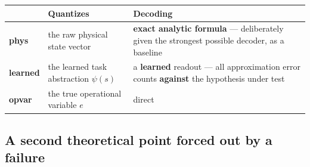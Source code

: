 \documentclass[11pt]{article}
\begin{document}
\begin{longtable}[]{@{}lll@{}}
\toprule
\begin{minipage}[b]{0.30\columnwidth}\raggedright
\strut
\end{minipage} & \begin{minipage}[b]{0.30\columnwidth}\raggedright
Quantizes\strut
\end{minipage} & \begin{minipage}[b]{0.30\columnwidth}\raggedright
Decoding\strut
\end{minipage}\tabularnewline
\midrule
\endhead
\begin{minipage}[t]{0.30\columnwidth}\raggedright
\textbf{phys}\strut
\end{minipage} & \begin{minipage}[t]{0.30\columnwidth}\raggedright
the raw physical state vector\strut
\end{minipage} & \begin{minipage}[t]{0.30\columnwidth}\raggedright
\textbf{exact analytic formula} --- deliberately given the strongest possible decoder, as a baseline\strut
\end{minipage}\tabularnewline
\begin{minipage}[t]{0.30\columnwidth}\raggedright
\textbf{learned}\strut
\end{minipage} & \begin{minipage}[t]{0.30\columnwidth}\raggedright
the learned task abstraction \(\psi(s)\)\strut
\end{minipage} & \begin{minipage}[t]{0.30\columnwidth}\raggedright
a \textbf{learned} readout --- all approximation error counts \textbf{against} the hypothesis under test\strut
\end{minipage}\tabularnewline
\begin{minipage}[t]{0.30\columnwidth}\raggedright
\textbf{opvar}\strut
\end{minipage} & \begin{minipage}[t]{0.30\columnwidth}\raggedright
the true operational variable \(e\)\strut
\end{minipage} & \begin{minipage}[t]{0.30\columnwidth}\raggedright
direct\strut
\end{minipage}\tabularnewline
\bottomrule
\end{longtable}

\hypertarget{a-second-theoretical-point-forced-out-by-a-failure}{%
\subsection{A second theoretical point forced out by a failure}\label{a-second-theoretical-point-forced-out-by-a-failure}}
\end{document}
